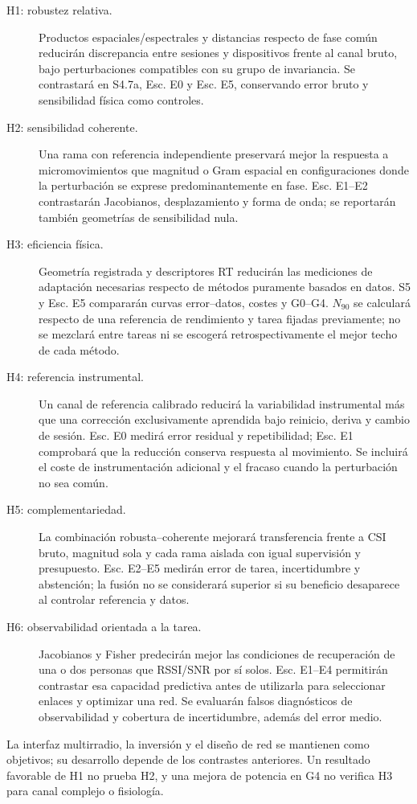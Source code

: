 \begin{description}
\item[H1: robustez relativa.] Productos espaciales/espectrales y distancias respecto de
fase común reducirán discrepancia entre sesiones y dispositivos frente al canal bruto,
bajo perturbaciones compatibles con su grupo de invariancia. Se contrastará en S4.7a,
Esc. E0 y Esc. E5, conservando error bruto y sensibilidad física como controles.
\item[H2: sensibilidad coherente.] Una rama con referencia independiente preservará mejor
la respuesta a micromovimientos que magnitud o Gram espacial en configuraciones donde
la perturbación se exprese predominantemente en fase. Esc. E1--E2 contrastarán Jacobianos,
desplazamiento y forma de onda; se reportarán también geometrías de sensibilidad nula.
\item[H3: eficiencia física.] Geometría registrada y descriptores RT reducirán las
mediciones de adaptación necesarias respecto de métodos puramente basados en datos.
S5 y Esc. E5 compararán curvas error--datos, costes y G0--G4. $N_{90}$ se calculará
respecto de una referencia de rendimiento y tarea fijadas previamente; no se mezclará
entre tareas ni se escogerá retrospectivamente el mejor techo de cada método.
\item[H4: referencia instrumental.] Un canal de referencia calibrado reducirá la
variabilidad instrumental más que una corrección exclusivamente aprendida bajo reinicio,
deriva y cambio de sesión. Esc. E0 medirá error residual y repetibilidad; Esc. E1
comprobará que la reducción conserva respuesta al movimiento. Se incluirá el coste
de instrumentación adicional y el fracaso cuando la perturbación no sea común.
\item[H5: complementariedad.] La combinación robusta--coherente mejorará transferencia
frente a CSI bruto, magnitud sola y cada rama aislada con igual supervisión y presupuesto.
Esc. E2--E5 medirán error de tarea, incertidumbre y abstención; la fusión no se
considerará superior si su beneficio desaparece al controlar referencia y datos.
\item[H6: observabilidad orientada a la tarea.] Jacobianos y Fisher predecirán mejor las
condiciones de recuperación de una o dos personas que RSSI/SNR por sí solos. Esc. E1--E4
permitirán contrastar esa capacidad predictiva antes de utilizarla para seleccionar enlaces
y optimizar una red. Se evaluarán falsos diagnósticos de observabilidad y cobertura de
incertidumbre, además del error medio.
\end{description}

La interfaz multirradio, la inversión y el diseño de red se mantienen como objetivos;
su desarrollo depende de los contrastes anteriores. Un resultado favorable de H1 no
prueba H2, y una mejora de potencia en G4 no verifica H3 para canal complejo o fisiología.

